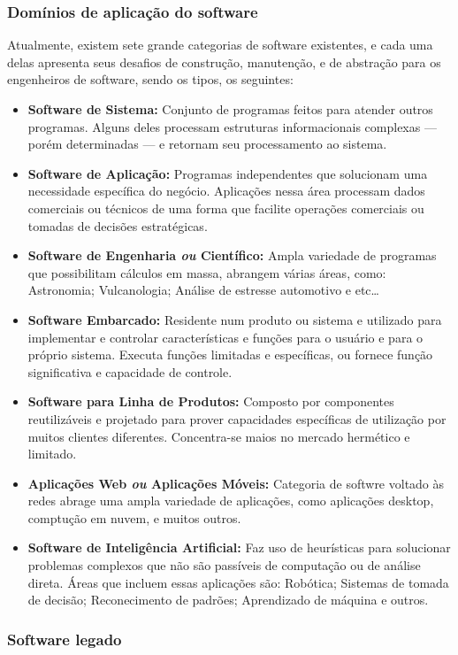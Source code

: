 \documentclass[12pt, a4paper]{paper}
\begin{document}
\subsubsection{Domínios de aplicação do software}
Atualmente, existem sete grande categorias de software existentes, e cada uma delas apresenta seus desafios de construção, manutenção, e de abstração para os engenheiros de software, sendo os tipos, os seguintes:
\begin{itemize}

  \item \textbf{Software de Sistema: } Conjunto de programas feitos para atender outros programas. Alguns deles processam estruturas informacionais complexas --- porém determinadas --- e retornam seu processamento ao sistema.
  \item \textbf{Software de Aplicação: }Programas independentes que solucionam uma necessidade específica do negócio. Aplicações nessa área processam dados comerciais ou técnicos de uma forma que facilite operações comerciais ou tomadas de decisões estratégicas.
  \item \textbf{Software de Engenharia \textit{ou} Científico: } Ampla variedade de programas que possibilitam cálculos em massa, abrangem várias áreas, como: Astronomia; Vulcanologia; Análise de estresse automotivo e etc\dots
  \item \textbf{Software Embarcado: } Residente num produto ou sistema e utilizado para implementar e controlar características e funções para o usuário e para o próprio sistema. Executa funções limitadas e específicas, ou fornece função significativa e capacidade de controle.
  \item \textbf{Software para Linha de Produtos: } Composto por componentes reutilizáveis e projetado para prover capacidades específicas de utilização por muitos clientes diferentes. Concentra-se maios no mercado hermético e limitado.
  \item \textbf{Aplicações Web \textit{ou} Aplicações Móveis: } Categoria de softwre voltado às redes abrage uma ampla variedade de aplicações, como aplicações desktop, comptução em nuvem, e muitos outros.
  \item \textbf{Software de Inteligência Artificial: } Faz uso de heurísticas para solucionar problemas complexos que não são passíveis de computação ou de análise direta. Áreas que incluem essas aplicações são: Robótica; Sistemas de tomada de decisão; Reconecimento de padrões; Aprendizado de máquina e outros.
\end{itemize}

\subsubsection{Software legado}
\end{document}
